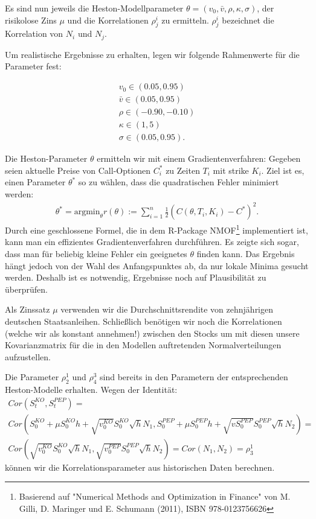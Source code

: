 \documentclass[12pt]{article}
\begin{document}
	Es sind nun jeweils die Heston-Modellparameter $\theta=(v_0,\bar v, \rho, \kappa, \sigma)$, der risikolose Zins $\mu$ und die Korrelationen $\rho^i_j$ zu ermitteln. $\rho^{i}_j$ bezeichnet die Korrelation von $N_i$ und $N_j$.
	
	Um realistische Ergebnisse zu erhalten, legen wir folgende Rahmenwerte für die Parameter fest:
	
	
	
	
	
	
	\begin{gather*}
	v_0 \in (0.05,0.95) \\
	\bar v  \in (0.05,0.95) \\
	\rho \in (-0.90,-0.10) \\
	\kappa \in (1,5) \\
	\sigma \in (0.05,0.95).
	\end{gather*}
	
	
	
	
	Die Heston-Parameter $\theta$ ermitteln wir mit einem Gradientenverfahren: Gegeben seien aktuelle Preise von Call-Optionen $C_i^*$ zu Zeiten $T_i$ mit strike $K_i$. Ziel ist es, einen Parameter $\theta^*$ so zu wählen, dass die quadratischen Fehler minimiert werden:
	\begin{gather*}
	\theta^*=\text{argmin}_{\theta} r(\theta):=\sum_{i=1}^n \frac12 (C(\theta,T_i,K_i)-C^*)^2.
	\end{gather*}
	Durch eine geschlossene Formel, die in dem R-Package \glqq NMOF\grqq\footnote{Basierend auf "Numerical Methods and Optimization in Finance" von M. Gilli, D. Maringer und E. Schumann (2011), ISBN 978-0123756626} implementiert ist, kann man ein effizientes Gradientenverfahren durchführen. Es zeigte sich sogar, dass man für beliebig kleine Fehler ein geeignetes $\theta$ finden kann. Das Ergebnis hängt jedoch von der Wahl des Anfangspunktes ab, da nur lokale Minima gesucht werden. Deshalb ist es notwendig, Ergebnisse noch auf Plausibilität zu überprüfen.
	
	Als Zinssatz $\mu$ verwenden wir die Durchschnittsrendite von zehnjährigen deutschen Staatsanleihen. 
	Schließlich benötigen wir noch die Korrelationen (welche wir als konstant annehmen!) zwischen den Stocks um mit diesen unsere Kovarianzmatrix für die in den Modellen auftretenden Normalverteilungen aufzustellen.
	
	Die Parameter $\rho^1_2$ und $\rho^3_4$ sind bereits in den Parametern der entsprechenden Heston-Modelle erhalten. 
	Wegen der Identität:
	\begin{gather*}
	Cor(S^{KO}_t,S^{PEP}_t)= \\
	Cor\left(S^{KO}_0+\mu S^{KO}_0h+\sqrt{v^{KO}_0}S^{KO}_0\sqrt{h}N_1,S^{PEP}_0+\mu S^{PEP}_0h+\sqrt{vS^{PEP}_0}S^{PEP}_0\sqrt{h}N_2\right)= \\
	Cor\left(\sqrt{v^{KO}_0}S^{KO}_0\sqrt{h}N_1,\sqrt{v^{PEP}_0}S^{PEP}_0\sqrt{h}N_2\right)=Cor(N_1,N_2)=\rho^1_3
	\end{gather*}
	können wir die Korrelationsparameter aus historischen Daten berechnen.
	
\end{document}
